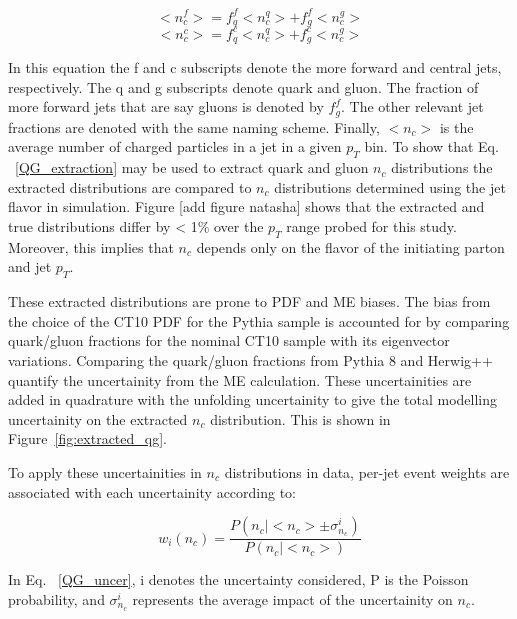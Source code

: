 \begin{equation}
<n_{c}^{f}> = f_{q}^{f}<n_{c}^{q}> + f^{f}_{g}<n_{c}^{g}>
\end{equation}
\begin{equation}
<n_{c}^{c}> = f_{q}^{c}<n_{c}^{q}> + f^{c}_{g}<n_{c}^{g}> 
\end{equation}


In this equation the f and c subscripts denote the more forward and central jets, respectively. The q and g subscripts denote quark and gluon. The fraction of more forward jets that are say gluons is denoted by $f_{g}^{f}$. The other relevant jet fractions are denoted with the same naming scheme. Finally, $<n_{c}>$ is the average number of charged particles in a jet in a given $p_{T}$ bin. To show that Eq. ~\eqref{QG_extraction} may be used to extract quark and gluon $n_{c}$ distributions the extracted distributions are compared to $n_{c}$ distributions determined using the jet flavor in simulation. Figure [add figure natasha] shows that the extracted and true distributions differ by < 1\% over the $p_{T}$ range probed for this study. Moreover, this implies that $n_{c}$ depends only on the flavor of the initiating parton and jet $p_{T}$. 

These extracted distributions are prone to PDF and ME biases. The bias from the choice of the CT10 PDF for the Pythia sample is accounted for by comparing quark/gluon fractions for the nominal CT10 sample with its eigenvector variations. Comparing the quark/gluon fractions from Pythia 8 and Herwig++ quantify the uncertainity from the ME calculation. These uncertainities are added in quadrature with the unfolding uncertainity to give the total modelling uncertainity on the extracted $n_{c}$ distribution. This is shown in Figure~\ref{fig:extracted_qg}.

To apply these uncertainities in $n_{c}$ distributions in data, per-jet event weights are associated with each uncertainity according to:

\begin{equation}
w_{i}(n_{c}) = \frac{P(n_{c}|<n_{c}> \pm \sigma^{i}_{n_{c}})} {P(n_{c}|<n_{c}>)}
\end{equation}

In Eq. ~\eqref{QG_uncer}, i denotes the uncertainty considered, P is the Poisson probability, and $\sigma^{i}_{n_{c}}$ represents the average impact of the uncertainity on $n_{c}$. 



